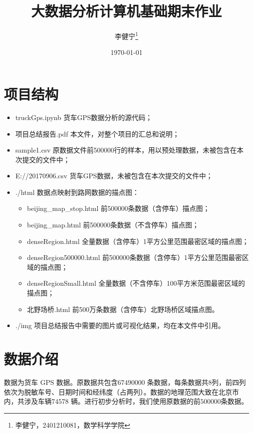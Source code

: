 \documentclass[UTF8]{ctexart}
\title{大数据分析计算机基础期末作业}
\date{\today}
\author{李健宁\thanks{李健宁，2401210081，数学科学学院}}
\begin{document}
\maketitle

\tableofcontents

\clearpage

\section{项目结构}

\begin{itemize}
    \item truckGps.ipynb 货车GPS数据分析的源代码；
    \item 项目总结报告.pdf 本文件，对整个项目的汇总和说明；
    \item sample1.csv 原数据文件前500000行的样本，用以预处理数据，未被包含在本次提交的文件中；
    \item E://20170906.csv 货车GPS数据，未被包含在本次提交的文件中；
    \item ./html 数据点映射到路网数据的描点图：
        \begin{itemize} 
            \item beijing\_map\_stop.html 前500000条数据（含停车）描点图；
            \item beijing\_map.html 前500000条数据（不含停车）描点图；
            \item denseRegion.html 全量数据（含停车）1平方公里范围最密区域的描点图；
            \item denseRegion500000.html 前500000条数据（含停车）1平方公里范围最密区域的描点图；
            \item denseRegionSmall.html 全量数据（不含停车）100平方米范围最密区域的描点图；
            \item 北野场桥.html 前500万条数据（含停车）北野场桥区域描点图。
        \end{itemize}   
    \item ./img 项目总结报告中需要的图片或可视化结果，均在本文件中引用。
\end{itemize}

\section{数据介绍}

数据为货车 GPS 数据。原数据共包含$67490000$ 条数据，每条数据共8列，前四列依次为脱敏车号、日期时间和经纬度（占两列）。数据的地理范围大致在北京市内，共涉及车辆$74578$ 辆。进行初步分析时，我们使用原数据的前$500000$条数据。
\end{document}
